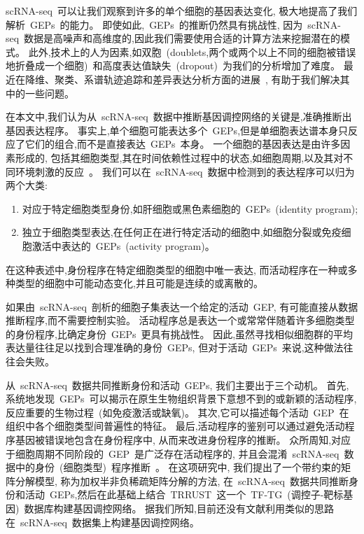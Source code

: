 scRNA-seq~可以让我们观察到许多的单个细胞的基因表达变化,
极大地提高了我们解析~GEPs~的能力。
即使如此,~GEPs~的推断仍然具有挑战性,
因为~scRNA-seq~数据是高噪声和高维度的,因此我们需要使用合适的计算方法来挖掘潜在的模式。
此外,技术上的人为因素,如双胞~(doublets,两个或两个以上不同的细胞被错误地折叠成一个细胞)~和高度表达值缺失~(dropout)~为我们的分析增加了难度。
最近在降维、聚类、系谱轨迹追踪和差异表达分析方面的进展~\cite{amir2013visne,kharchenko2014bayesian,satija2015spatial,trapnell2014dynamics},
有助于我们解决其中的一些问题。

在本文中,我们认为从~scRNA-seq~数据中推断基因调控网络的关键是,准确推断出基因表达程序。
事实上,单个细胞可能表达多个~GEPs,但是单细胞表达谱本身只反应了它们的组合,而不是直接表达~GEPs~本身。
一个细胞的基因表达是由许多因素形成的,
包括其细胞类型,其在时间依赖性过程中的状态,如细胞周期,以及其对不同环境刺激的反应~\cite{wagner2016revealing}。
我们可以在~scRNA-seq~数据中检测到的表达程序可以归为两个大类:
\begin{enumerate}
    \item 对应于特定细胞类型身份,如肝细胞或黑色素细胞的~GEPs~(identity program);
    \item 独立于细胞类型表达,在任何正在进行特定活动的细胞中,如细胞分裂或免疫细胞激活中表达的~GEPs~(activity program)。
\end{enumerate}
在这种表述中,身份程序在特定细胞类型的细胞中唯一表达,
而活动程序在一种或多种类型的细胞中可能动态变化,并且可能是连续的或离散的。

如果由~scRNA-seq~剖析的细胞子集表达一个给定的活动~GEP,
有可能直接从数据推断程序,而不需要控制实验。
活动程序总是表达一个或常常伴随着许多细胞类型的身份程序,比确定身份~GEPs~更具有挑战性。
因此,虽然寻找相似细胞群的平均表达量往往足以找到合理准确的身份~GEPs,
但对于活动~GEPs~来说,这种做法往往会失败。

从~scRNA-seq~数据共同推断身份和活动~GEPs, 我们主要出于三个动机。
首先,系统地发现~GEPs~可以揭示在原生生物组织背景下意想不到的或新颖的活动程序,
反应重要的生物过程~(如免疫激活或缺氧)。
其次,它可以描述每个活动~GEP~在组织中各个细胞类型间普遍性的特征。
最后,活动程序的鉴别可以通过避免活动程序基因被错误地包含在身份程序中, 从而来改进身份程序的推断。
众所周知,对应于细胞周期不同阶段的~GEP~是广泛存在活动程序的,
并且会混淆~scRNA-seq~数据中的身份~(细胞类型)~程序推断~\cite{scialdone2015computational,chen2017controlling}。
在这项研究中, 我们提出了一个带约束的矩阵分解模型, 称为加权半非负稀疏矩阵分解的方法,
在~scRNA-seq~数据共同推断身份和活动~GEPs,然后在此基础上结合~TRRUST~这一个~TF-TG~(调控子-靶标基因)~数据库构建基因调控网络。
据我们所知,目前还没有文献利用类似的思路在~scRNA-seq~数据集上构建基因调控网络。

